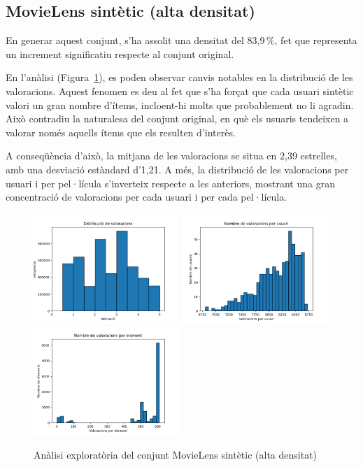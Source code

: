 \documentclass[a4paper,12pt]{report}
\begin{document}
\subsection{MovieLens sintètic (alta densitat)}

En generar aquest conjunt, s'ha assolit una densitat del 83,9\,\%, fet que representa un increment significatiu respecte al conjunt original.

En l'anàlisi (Figura~\ref{fig:analisis_ml_synthetic_high_dens}), es poden observar canvis notables en la distribució de les valoracions. Aquest fenomen es deu al fet que s'ha forçat que cada usuari sintètic valori un gran nombre d'ítems, incloent-hi molts que probablement no li agradin. Això contradiu la naturalesa del conjunt original, en què els usuaris tendeixen a valorar només aquells ítems que els resulten d'interès.

A conseqüència d'això, la mitjana de les valoracions se situa en 2,39 estrelles, amb una desviació estàndard d'1,21. A més, la distribució de les valoracions per usuari i per pel·lícula s'inverteix respecte a les anteriors, mostrant una gran concentració de valoracions per cada usuari i per cada pel·lícula.
\begin{figure} [H]
    \centering
    \includegraphics[width=0.49\textwidth]{Figuras/syn80-ratings.png}
    \hfill
    \includegraphics[width=0.49\textwidth]{Figuras/syn80-users.png}
    \hfill
    \includegraphics[width=0.49\textwidth]{Figuras/syn80-items.png}
    \caption{Anàlisi exploratòria del conjunt MovieLens sintètic (alta densitat)}
    \label{fig:analisis_ml_synthetic_high_dens}
\end{figure}
\end{document}
